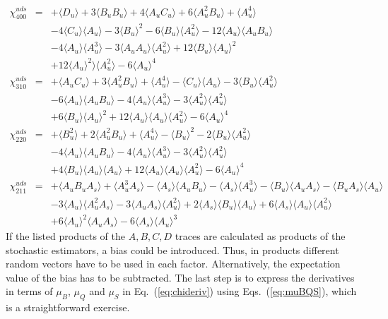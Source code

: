 \documentclass[a4paper,11pt]{article}
\begin{document}
\begin{eqnarray}
\chi^{uds}_{400} &=&
+ \langle D_u\rangle
+3 \langle B_u B_u\rangle
+4 \langle A_u C_u\rangle
+6 \langle A_u^2B_u\rangle
+ \langle A_u^4\rangle\nonumber\\
&&
-4 \langle C_u\rangle\langle A_u\rangle
-3 \langle B_u\rangle^2
-6 \langle B_u\rangle\langle A_u^2\rangle
-12 \langle A_u\rangle\langle A_u B_u\rangle\nonumber\\
&&
-4 \langle A_u\rangle\langle A_u^3\rangle
-3 \langle A_u A_u\rangle\langle A_u^2\rangle
+12 \langle B_u\rangle\langle A_u\rangle^2\nonumber\\
&&
+12 \langle A_u\rangle^2\rangle\langle A_u^2\rangle
-6 \langle A_u\rangle^4
\\
\chi^{uds}_{310} &=&
+ \langle A_u C_u\rangle
+3 \langle A_u^2 B_u\rangle
+ \langle A_u^4\rangle
- \langle C_u\rangle\langle A_u\rangle
-3 \langle B_u\rangle\langle A_u^2\rangle\nonumber\\
&&
-6 \langle A_u\rangle\langle A_u B_u\rangle
-4 \langle A_u\rangle\langle A_u^3\rangle
-3 \langle A_u^2\rangle\langle A_u^2\rangle\nonumber\\
&&
+6 \langle B_u\rangle\langle A_u\rangle^2
+12 \langle A_u\rangle\langle A_u\rangle\langle A_u^2\rangle
-6 \langle A_u\rangle^4
\\
\chi^{uds}_{220} &=&
+ \langle B_u^2\rangle
+2 \langle A_u^2 B_u\rangle
+ \langle A_u^4\rangle
- \langle B_u\rangle^2
-2 \langle B_u\rangle\langle A_u^2\rangle\nonumber\\
&&
-4 \langle A_u\rangle\langle A_u B_u\rangle
-4 \langle A_u\rangle\langle A_u^3\rangle
-3 \langle A_u^2\rangle\langle A_u^2\rangle\nonumber\\
&&
+4 \langle B_u\rangle\langle A_u\rangle\langle A_u\rangle
+12 \langle A_u\rangle\langle A_u\rangle\langle A_u^2\rangle
-6 \langle A_u\rangle^4
\\
\chi^{uds}_{211} &=&
+ \langle A_u B_u A_s\rangle
+ \langle A_u^3A_s\rangle
- \langle A_s\rangle\langle A_u B_u\rangle
- \langle A_s\rangle\langle A_u^3\rangle
- \langle B_u\rangle\langle A_u A_s\rangle
- \langle B_u A_s\rangle\langle A_u\rangle\nonumber\\
&&
-3 \langle A_u\rangle\langle A_u^2 A_s\rangle
-3 \langle A_u A_s\rangle\langle A_u^2\rangle
+2 \langle A_s\rangle\langle B_u\rangle\langle A_u\rangle
+6 \langle A_s\rangle\langle A_u\rangle\langle A_u^2\rangle\nonumber\\
&&
+6 \langle A_u\rangle^2\langle A_u A_s\rangle
-6 \langle A_s\rangle\langle A_u\rangle^3
\end{eqnarray}
If the listed products of the $A,B,C,D$ traces are calculated as products of the stochastic
estimators, a bias could be introduced. Thus, in products different random
vectors have to be used in each factor. Alternatively, the expectation value of
the bias has to be subtracted.
The last step is to express the derivatives in terms of $\mu_B$, $\mu_Q$ and
$\mu_S$ in Eq.~(\ref{eq:chideriv}) using Eqs.~(\ref{eq:muBQS}), which is a
straightforward exercise.
\end{document}
